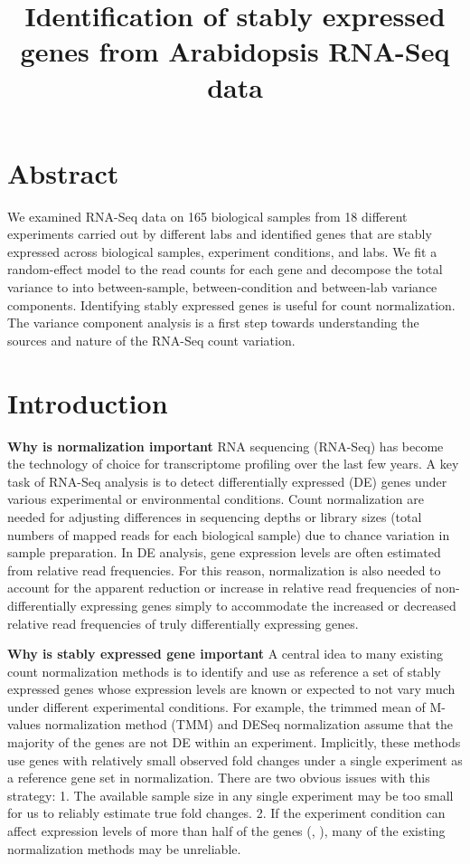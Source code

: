 \documentclass[11pt, a4paper]{article}
\title{Identification of stably expressed genes from Arabidopsis RNA-Seq data}
\date{} %
\begin{document}
\maketitle

\section*{Abstract}
We examined RNA-Seq data on 165 biological samples from 18 different
experiments carried out by different labs and identified genes that are stably
expressed across biological samples, experiment conditions, and labs. We fit a
random-effect model to the read counts for each gene and decompose the total
variance to into between-sample, between-condition and between-lab variance
components. Identifying stably expressed genes is useful for count
normalization. The variance component analysis is a first step towards
understanding the sources and nature of the RNA-Seq count variation.


\section{Introduction}

\textbf{Why is normalization important}
RNA sequencing (RNA-Seq) has become the technology of choice for transcriptome
profiling over the last few years. A key task of RNA-Seq analysis is to detect
differentially expressed (DE) genes under various experimental or
environmental conditions. Count normalization are needed for adjusting
differences in sequencing depths or library sizes (total numbers of mapped
reads for each biological sample) due to chance variation in sample
preparation.  In DE analysis, gene expression levels are often estimated from
relative read frequencies. For this reason, normalization is also needed to
account for the apparent reduction or increase in relative read frequencies of
non-differentially expressing genes simply to accommodate the increased or
decreased relative read frequencies of truly differentially expressing genes.

\textbf{Why is stably expressed gene important}
A central idea to many existing count normalization methods is to identify and
use as reference a set of stably expressed genes whose expression levels are
known or expected to not vary much under different experimental conditions.
For example, the trimmed mean of M-values normalization method	(TMM) \citep{robinson2010scaling} and DESeq normalization \citep{anders2010differential}  assume that the majority of
the genes are not DE within an experiment. 
Implicitly, these methods use genes with relatively small observed fold
changes under a single experiment as a reference gene set in normalization.
There are two obvious issues with this strategy: 1. The available sample size
in any single experiment may be too small for us to reliably estimate true
fold changes. 2.  If the experiment condition can affect expression levels of
more than half of the genes (\cite{loven2012revisiting}, \cite{wu2013use}), many of the existing normalization methods may be unreliable. 
\end{document}
